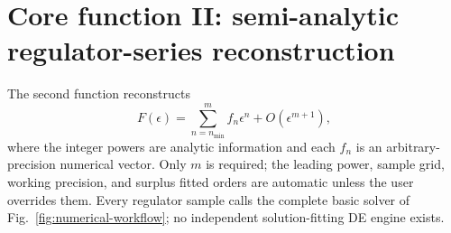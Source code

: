 \documentclass[11pt]{article}
\newcommand{\eps}{\epsilon}
\begin{document}
\section{Core function II: semi-analytic regulator-series reconstruction}
\label{sec:reconstruction-overview}

The second function reconstructs
\begin{equation}
 F(\eps)=\sum_{n=n_{\min}}^{m}f_n\eps^n+O(\eps^{m+1}),
\end{equation}
where the integer powers are analytic information and each $f_n$ is an arbitrary-precision
numerical vector.  Only $m$ is required; the leading power, sample grid, working precision,
and surplus fitted orders are automatic unless the user overrides them.  Every regulator
sample calls the complete basic solver of Fig.~\ref{fig:numerical-workflow}; no independent
solution-fitting DE engine exists.
\end{document}
